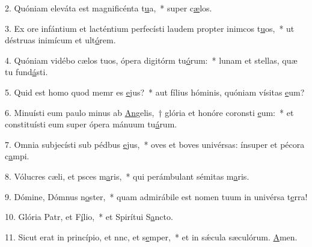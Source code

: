 2. Quóniam eleváta est magnificénta t\uline{u}a,~* super c\uline{æ}los.\par 
3. Ex ore infántium et lacténtium perfecísti laudem propter inimcos t\uline{u}os,~* ut déstruas inimícum et ult\uline{ó}rem.\par 
4. Quóniam vidébo cælos tuos, ópera digitórm tu\uline{ó}rum:~* lunam et stellas, quæ tu fund\uline{á}sti.\par 
5. Quid est homo quod memr es \uline{e}jus?~* aut fílius hóminis, quóniam vísitas \uline{e}um?\par 
6. Minuísti eum paulo minus ab \uline{An}gelis,~† glória et honóre coronsti \uline{e}um:~* et constituísti eum super ópera mánuum tu\uline{á}rum.\par 
7. Omnia subjecísti sub pédbus \uline{e}jus,~* oves et boves univérsas: ínsuper et pécora c\uline{a}mpi.\par 
8. Vólucres cæli, et psces m\uline{a}ris,~* qui perámbulant sémitas m\uline{a}ris.\par 
9. Dómine, Dómnus n\uline{o}ster,~* quam admirábile est nomen tuum in univérsa t\uline{e}rra!\par 
10. Glória Patr, et F\uline{í}lio,~* et Spirítui S\uline{a}ncto.\par 
11. Sicut erat in princípio, et nnc, et s\uline{e}mper,~* et in sǽcula sæculórum. \uline{A}men.\par 
